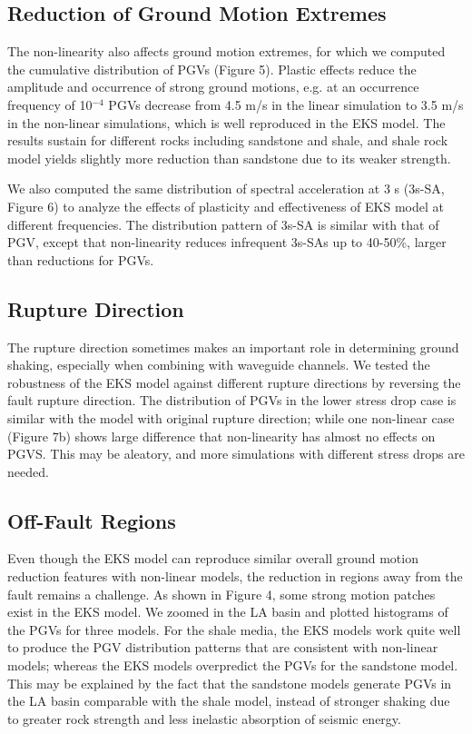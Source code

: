 \subsection{Reduction of Ground Motion Extremes}
The non-linearity also affects ground motion extremes, for which we computed the cumulative distribution of PGVs (Figure 5). Plastic effects reduce the amplitude and occurrence of strong ground motions, e.g. at an occurrence frequency of 10$^{-4}$ PGVs decrease from 4.5 m/s in the linear simulation to 3.5 m/s in the non-linear simulations, which is well reproduced in the EKS model. The results sustain for different rocks including sandstone and shale, and shale rock model yields slightly more reduction than sandstone due to its weaker strength.

We also computed the same distribution of spectral acceleration at 3 s (3s-SA, Figure 6) to analyze the effects of plasticity and effectiveness of EKS model at different frequencies. The distribution pattern of 3s-SA is similar with that of PGV, except that non-linearity reduces infrequent 3s-SAs up to 40-50\%, larger than reductions for PGVs.

\subsection{Rupture Direction}
The rupture direction sometimes makes an important role in determining ground shaking, especially when combining with waveguide channels. We tested the robustness of the EKS model against different rupture directions by reversing the fault rupture direction. The distribution of PGVs in the lower stress drop case is similar with the model with original rupture direction; while one non-linear case (Figure 7b) shows large difference that non-linearity has almost no effects on PGVS.  This may be aleatory, and more simulations with different stress drops are needed.

\subsection{Off-Fault Regions}

Even though the EKS model can reproduce similar overall ground motion reduction features with non-linear models, the reduction in regions away from the fault remains a challenge. As shown in Figure 4, some strong motion patches exist in the EKS model. We zoomed in the LA basin and plotted histograms of the PGVs for three models. For the shale media, the EKS models work quite well to produce the PGV distribution patterns that are consistent with non-linear models; whereas the EKS models overpredict the PGVs for the sandstone model. This may be explained by the fact that the sandstone models generate PGVs in the LA basin comparable with the shale model, instead of stronger shaking due to greater rock strength and less inelastic absorption of seismic energy.

